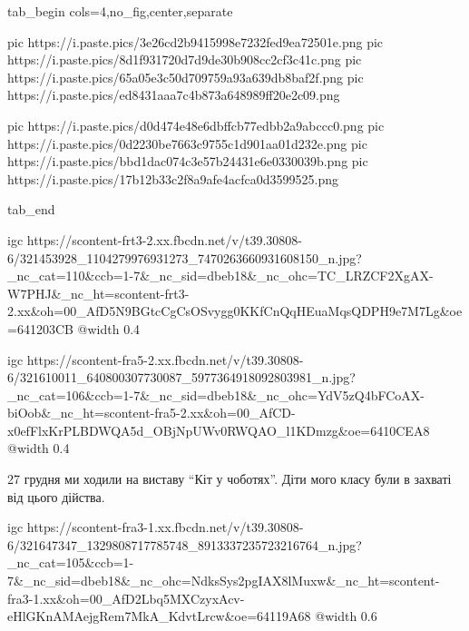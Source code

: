 \begin{center}
\begin{minipage}{\textwidth}

\ifcmt
  tab_begin cols=4,no_fig,center,separate

    pic https://i.paste.pics/3e26cd2b9415998e7232fed9ea72501e.png
    pic https://i.paste.pics/8d1f931720d7d9de30b908cc2cf3c41c.png
    pic https://i.paste.pics/65a05e3c50d709759a93a639db8baf2f.png
    pic https://i.paste.pics/ed8431aaa7c4b873a648989ff20e2c09.png

    pic https://i.paste.pics/d0d474e48e6dbffcb77edbb2a9abccc0.png
    pic https://i.paste.pics/0d2230be7663c9755c1d901aa01d232e.png
    pic https://i.paste.pics/bbd1dac074c3e57b24431e6e0330039b.png
    pic https://i.paste.pics/17b12b33c2f8a9afe4acfca0d3599525.png

  tab_end
\fi

\end{minipage}
\end{center}


\ifcmt
  igc https://scontent-frt3-2.xx.fbcdn.net/v/t39.30808-6/321453928_1104279976931273_7470263660931608150_n.jpg?_nc_cat=110&ccb=1-7&_nc_sid=dbeb18&_nc_ohc=TC_LRZCF2XgAX-W7PHJ&_nc_ht=scontent-frt3-2.xx&oh=00_AfD5N9BGtcCgCsOSvygg0KKfCnQqHEuaMqsQDPH9e7M7Lg&oe=641203CB
  @width 0.4
\fi


\ifcmt
  igc https://scontent-fra5-2.xx.fbcdn.net/v/t39.30808-6/321610011_640800307730087_5977364918092803981_n.jpg?_nc_cat=106&ccb=1-7&_nc_sid=dbeb18&_nc_ohc=YdV5zQ4bFCoAX-biOob&_nc_ht=scontent-fra5-2.xx&oh=00_AfCD-x0efFlxKrPLBDWQA5d_OBjNpUWv0RWQAO_l1KDmzg&oe=6410CEA8
  @width 0.4
\fi


27 грудня ми ходили на виставу \enquote{Кіт у чоботях}. Діти мого класу були в
захваті від цього дійства.

\ifcmt
  igc https://scontent-fra3-1.xx.fbcdn.net/v/t39.30808-6/321647347_1329808717785748_8913337235723216764_n.jpg?_nc_cat=105&ccb=1-7&_nc_sid=dbeb18&_nc_ohc=NdksSys2pgIAX8lMuxw&_nc_ht=scontent-fra3-1.xx&oh=00_AfD2Lbq5MXCzyxAcv-eHlGKnAMAejgRem7MkA_KdvtLrcw&oe=64119A68
  @width 0.6
\fi

